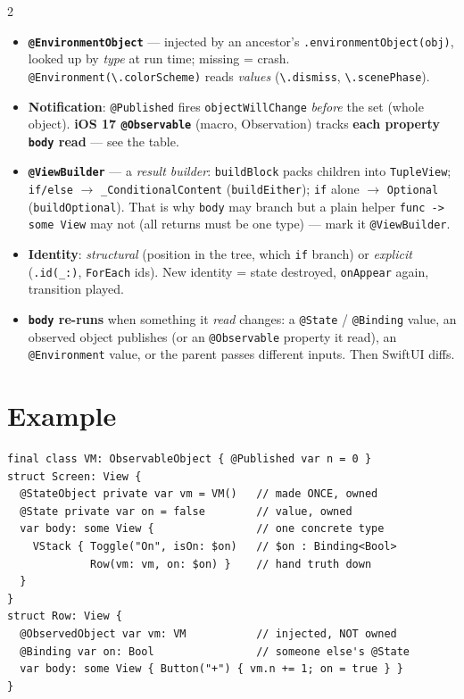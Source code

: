 \documentclass[8pt]{extarticle}
\begin{document}
\begin{multicols}{2}
\begin{itemize}
  \item \textbf{\texttt{@EnvironmentObject}} — injected by an ancestor's
        \texttt{.environmentObject(obj)}, looked up by \emph{type} at run time; missing = crash.
        \texttt{@Environment(\textbackslash.colorScheme)} reads \emph{values} (\texttt{\textbackslash.dismiss}, \texttt{\textbackslash.scenePhase}).
  \item \textbf{Notification}: \texttt{@Published} fires \texttt{objectWillChange} \emph{before} the set
        (whole object). \textbf{iOS 17 \texttt{@Observable}} (macro, Observation) tracks \textbf{each
        property \texttt{body} read} — see the table.
  \item \textbf{\texttt{@ViewBuilder}} — a \emph{result builder}: \texttt{buildBlock} packs children
        into \texttt{TupleView}; \texttt{if/else} $\to$ \texttt{\_ConditionalContent}
        (\texttt{buildEither}); \texttt{if} alone $\to$ \texttt{Optional} (\texttt{buildOptional}).
        That is why \texttt{body} may branch but a plain helper \texttt{func -> some View} may not
        (all returns must be one type) — mark it \texttt{@ViewBuilder}.
  \item \textbf{Identity}: \emph{structural} (position in the tree, which \texttt{if} branch) or
        \emph{explicit} (\texttt{.id(\_:)}, \texttt{ForEach} ids). New identity = state destroyed,
        \texttt{onAppear} again, transition played.
  \item \textbf{\texttt{body} re-runs} when something it \emph{read} changes: a \texttt{@State} /
        \texttt{@Binding} value, an observed object publishes (or an \texttt{@Observable} property it read),
        an \texttt{@Environment} value, or the parent passes different inputs. Then SwiftUI diffs.
\end{itemize}

\section{Example}
\begin{lstlisting}[language=SwiftSheet]
final class VM: ObservableObject { @Published var n = 0 }
struct Screen: View {
  @StateObject private var vm = VM()   // made ONCE, owned
  @State private var on = false        // value, owned
  var body: some View {                // one concrete type
    VStack { Toggle("On", isOn: $on)   // $on : Binding<Bool>
             Row(vm: vm, on: $on) }    // hand truth down
  }
}
struct Row: View {
  @ObservedObject var vm: VM           // injected, NOT owned
  @Binding var on: Bool                // someone else's @State
  var body: some View { Button("+") { vm.n += 1; on = true } }
}
\end{lstlisting}


\end{multicols}
\end{document}
